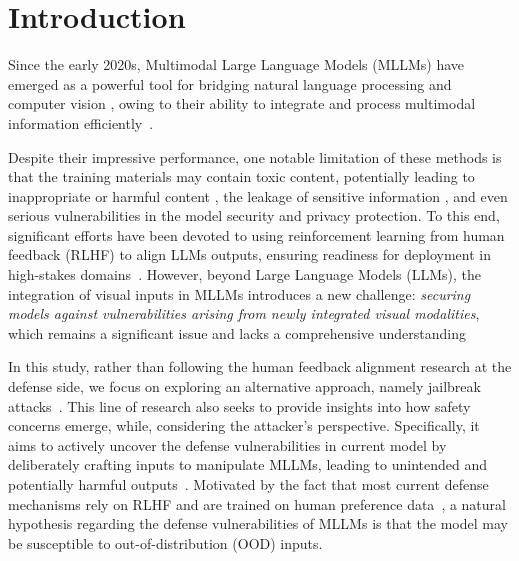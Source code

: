 \section{Introduction}
\label{sec:intro}


Since the early 2020s, Multimodal Large Language Models (MLLMs) have emerged as a powerful tool for bridging natural language processing and computer vision \cite{cui2024survey}, owing to their ability to integrate and process multimodal information efficiently~\cite{tan2024harnessing}.

Despite their impressive performance, one notable limitation of these methods is that the training materials may contain toxic content, potentially leading to inappropriate or harmful content \cite{zhang2024jailbreak, deshpande2023toxicity}, the leakage of sensitive information \cite{yu2024llm}, and even serious vulnerabilities in the model security and privacy protection. To this end, significant efforts have been devoted to using reinforcement learning from human feedback (RLHF) to align LLMs outputs, ensuring readiness for deployment in high-stakes domains~\citep{ouyang2022training, wang2023self}. However, beyond Large Language Models (LLMs), the integration of visual inputs in MLLMs introduces a new challenge: \textit{securing models against vulnerabilities arising from newly integrated visual modalities}, which remains a significant issue and lacks a comprehensive understanding~\cite{yu2024hallucidoctor, lu2023set, liu2025mm}


In this study, rather than following the human feedback alignment research at the defense side, we focus on exploring an alternative approach, namely jailbreak attacks~\cite{wei2024jailbroken,yu2024llm,ma2024visual}. This line of research also seeks to provide insights into how safety concerns emerge, while, considering the attacker's perspective. Specifically, it aims to actively uncover the defense vulnerabilities in current model by deliberately crafting inputs to manipulate MLLMs, leading to unintended and potentially harmful outputs~\citep{liu2024making}. Motivated by the fact that most current defense mechanisms rely on RLHF and are trained on human preference data~\citep{ouyang2022training}, a natural hypothesis regarding the defense vulnerabilities of MLLMs is that the model may be susceptible to out-of-distribution (OOD) inputs.



